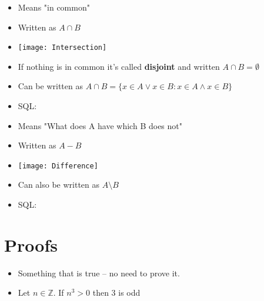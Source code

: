 \documentclass[english,10pt,a4paper]{article}
\begin{document}
\begin{theo}[Intersection] 
\begin{itemize}
\item Means "in common"
\item Written as $A \cap B$
\item[] \texttt{[image: Intersection]} 
\item If nothing is in common it's called \textbf{disjoint} and written $A \cap B = \emptyset$
\item Can be written as $A \cap B = \{ x \in A \vee x \in B : x \in A \wedge x \in B \}$
\item SQL: \\
\end{itemize}

\end{theo}



\begin{theo}[Difference] 
\begin{itemize}
\item Means "What does A have which B does not"
\item Written as $A - B$
\item[] \texttt{[image: Difference]} 
\item Can also be written as $A \setminus B $
\item SQL: \\
\end{itemize}

\end{theo}





\newpage
\section{Proofs}


\begin{theo} 
\begin{itemize}
\item Something that is true -- no need to prove it.
\item Let $n \in \mathbb{Z}$. If $n^3 > 0$ then 3 is odd
\end{itemize}
\end{theo}
\end{document}
